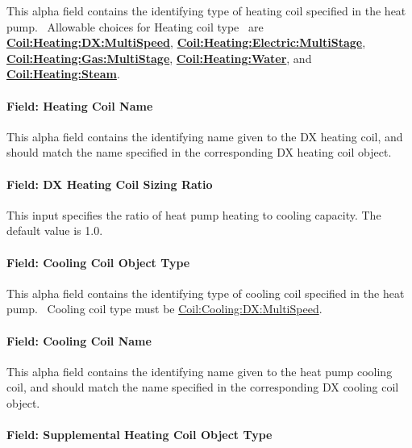 This alpha field contains the identifying type of heating coil specified in the heat pump.~ Allowable choices for Heating coil type~ are \textbf{\hyperref[coilheatingdxmultispeed]{Coil:Heating:DX:MultiSpeed}}, \textbf{\hyperref[coilheatingelectricmultistage]{Coil:Heating:Electric:MultiStage}}, \textbf{\hyperref[coilheatinggasmultistage]{Coil:Heating:Gas:MultiStage}}, \textbf{\hyperref[coilheatingwater]{Coil:Heating:Water}}, and~ \textbf{\hyperref[coilheatingsteam]{Coil:Heating:Steam}}.

\paragraph{Field: Heating Coil Name}\label{field-heating-coil-name-4}

This alpha field contains the identifying name given to the DX heating coil, and should match the name specified in the corresponding DX heating coil object.

\paragraph{Field: DX Heating Coil Sizing Ratio}\label{field-dx-heating-coil-sizing-ratio-0303}

This input specifies the ratio of heat pump heating to cooling capacity. The default value is 1.0.

\paragraph{Field: Cooling Coil Object Type}\label{field-cooling-coil-object-type-4}

This alpha field contains the identifying type of cooling coil specified in the heat pump.~ Cooling coil type must be \hyperref[coilcoolingdxmultispeed]{Coil:Cooling:DX:MultiSpeed}.

\paragraph{Field: Cooling Coil Name}\label{field-cooling-coil-name-4}

This alpha field contains the identifying name given to the heat pump cooling coil, and should match the name specified in the corresponding DX cooling coil object.

\paragraph{Field: Supplemental Heating Coil Object Type}\label{field-supplemental-heating-coil-object-type-2}

